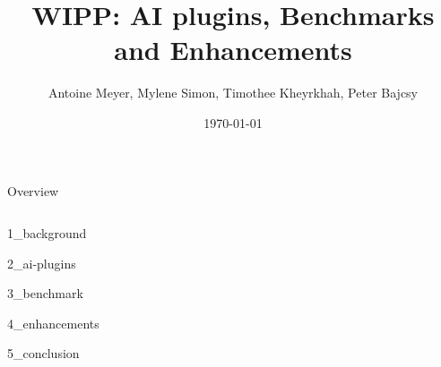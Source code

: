 \documentclass[aspectratio=169,table]{beamer}
\title{WIPP: AI plugins, Benchmarks and Enhancements}
\author[Author]{Antoine Meyer, Mylene Simon, Timothee Kheyrkhah, Peter Bajcsy}
\date[\today]{\today}
\begin{document}
  \begin{frame}[plain]
    \titlepage
  \end{frame}

  \begin{frame}{Overview}
    \begin{columns}[onlytextwidth,T]
      \begin{column}{.45\textwidth}
        \tableofcontents[sections=1-2]
      \end{column}
      \begin{column}{.45\textwidth}
        \tableofcontents[sections=3-5]
      \end{column}
    \end{columns}
  \end{frame}

  {1_background}

  \begin{frame}[plain]
    \centering
    \tableofcontents[sections=2]
  \end{frame}
  {2_ai-plugins}

  \begin{frame}[plain]
    \centering
    \tableofcontents[sections=3]
  \end{frame}
  {3_benchmark}

  \begin{frame}[plain]
    \centering
    \tableofcontents[sections=4]
  \end{frame}
  {4_enhancements}

  \begin{frame}[plain]
    \centering
    \tableofcontents[sections=5]
  \end{frame}
  {5_conclusion}


\end{document}
